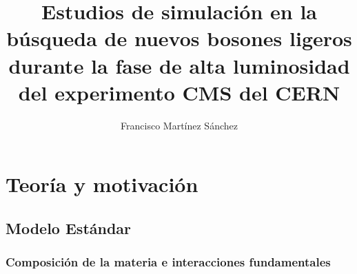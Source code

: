 \documentclass[12pt]{report}
\begin{document}
\title{Estudios de simulación en la búsqueda de nuevos bosones ligeros durante la fase de alta luminosidad del experimento CMS del CERN}
\author{Francisco Martínez Sánchez}
\maketitle
\begin{acknowledgements}

\end{acknowledgements}

\tableofcontents
\clearpage
\listoftables
\clearpage
\listoffigures
\clearpage

\begin{abstract}
\end{abstract}









\chapter{Teoría y motivación}


	
	\section{Modelo Estándar} 	
	
	
		\subsection{Composición de la materia e interacciones fundamentales} 
		
		
\end{document}

